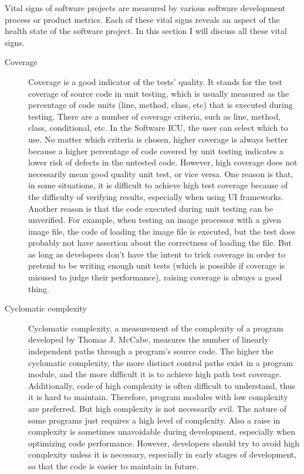 Vital signs of software projects are measured by various software development process or product metrics. Each of these vital signs reveals an aspect of the health state of the software project. In this section I will discuss all these vital signs.
\begin{description}
\item[Coverage] 
Coverage is a good indicator of the tests' quality. It stands for the test coverage of source code in unit testing, which is usually measured as the percentage of code units (line, method, class, etc) that is executed during testing. There are a number of coverage criteria, such as line, method, class, conditional, etc. In the Software ICU, the user can select which to use. No matter which criteria is chosen, higher coverage is always better because a higher percentage of code covered by unit testing indicates a lower risk of defects in the untested code. However, high coverage does not necessarily mean good quality unit test, or vice versa. One reason is that, in some situations, it is difficult to achieve high test coverage because of the difficulty of verifying results, especially when using UI frameworks. Another reason is that the code executed during unit testing can be unverified. For example, when testing an image processor with a given image file, the code of loading the image file is executed, but the test does probably not have assertion about the correctness of loading the file. But as long as developers don't have the intent to trick coverage in order to pretend to be writing enough unit tests (which is possible if coverage is misused to judge their performance), raising coverage is always a good thing.

\item[Cyclomatic complexity] 
Cyclomatic complexity, a measurement of the complexity of a program developed by Thomas J. McCabe, measures the number of linearly independent paths through a program's source code\cite{mccabe:complexity}. The higher the cyclomatic complexity, the more distinct control paths exist in a program module, and the more difficult it is to achieve high path test coverage. Additionally, code of high complexity is often difficult to understand, thus it is hard to maintain. Therefore, program modules  with low complexity are preferred. But high complexity is not necessarily evil. The nature of some programs just requires a high level of complexity. Also a raise in complexity is sometimes unavoidable during development, especially when optimizing code performance. However, developers should try to avoid high complexity unless it is necessary, especially in early stages of development, so that the code is easier to maintain in future.


\end{description}
